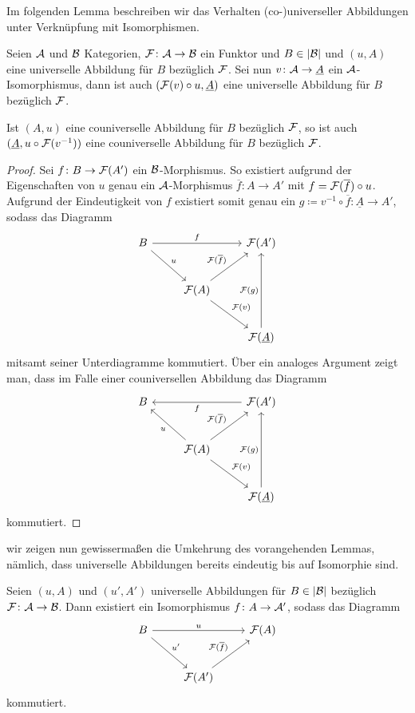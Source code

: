 Im folgenden Lemma beschreiben wir das Verhalten (co-)universeller Abbildungen unter Verknüpfung mit Isomorphismen.

\begin{lem}
  Seien $\mathcal{A}$ und $\mathcal{B}$ Kategorien, $\mathcal{F} \colon \mathcal{A} \to \mathcal{B}$ ein Funktor und $B \in |\mathcal{B}|$ und $(u,A)$ eine universelle Abbildung für $B$ bezüglich $\mathcal{F}$.
  Sei nun $v \colon \mathcal{A} \to \underline A$ ein $\mathcal{A}$-Isomorphismus, dann ist auch $(\mathcal{F}(v) \circ u, \underline A )$ eine universelle Abbildung für $B$ bezüglich $\mathcal{F}$.

  Ist $(A, u)$ eine couniverselle Abbildung für $B$ bezüglich $\mathcal{F}$, so ist auch $(\underline A, u \circ \mathcal{F}(v^{-1}))$ eine couniverselle Abbildung für $B$ bezüglich $\mathcal{F}$.
\end{lem}

\begin{proof}
  Sei $f \colon B \to \mathcal{F}(A')$ ein $\mathcal{B}$-Morphismus. 
  So existiert aufgrund der Eigenschaften von $u$ genau ein $\mathcal{A}$-Morphismus $\overline f \colon A \to A'$ mit $f = \mathcal{F}(\overline f) \circ u$.
  Aufgrund der Eindeutigkeit von $f$ existiert somit genau ein $g \coloneqq v^{-1} \circ \overline f \colon \underline A \to A'$, sodass das Diagramm   
  $$
  \begin{tikzcd}[row sep=2.5em]
    B \arrow[rd,"u"] \arrow[rr, "f"] &&\F(A') \\
    &\F(A) \arrow[ru, "\F(\overline{f})"] \arrow[rd,"\F(v)"] \\
    &&\F(\underline A) \arrow[uu,"\F(g)"]
  \end{tikzcd}
  $$
  mitsamt seiner Unterdiagramme kommutiert.
  Über ein analoges Argument zeigt man, dass im Falle einer couniversellen Abbildung das Diagramm
  $$
  \begin{tikzcd}[row sep=2.5em]
    B  & & \F(A') \arrow[ll, "f"]  \\
    & \F(A)\arrow[ru, "\F(\overline{f})"] \arrow[lu,"u"] \arrow[rd, "\F(v)"]  & \\
    & & \F(\underline A) \arrow[uu, "\F(g)"]
  \end{tikzcd}
  $$
  kommutiert.
\end{proof}

wir zeigen nun gewissermaßen die Umkehrung des vorangehenden Lemmas, nämlich, dass universelle Abbildungen bereits eindeutig bis auf Isomorphie sind.

\begin{prop}
  Seien $(u,A)$ und $(u',A')$ universelle Abbildungen für $B \in |\mathcal{B}|$ bezüglich $\mathcal{F} \colon \mathcal{A} \to \mathcal{B}$.
  Dann existiert ein Isomorphismus $f \colon A \to \mathcal{A}'$, sodass das Diagramm
  $$
  \begin{tikzcd}[row sep=2.5em]
    B \arrow[rd,"u'"] \arrow[rr, "u"] &&\F(A) \\
    &\F(A') \arrow[ru, "\F(\overline{f})"]
  \end{tikzcd}
  $$
  kommutiert.
\end{prop}

